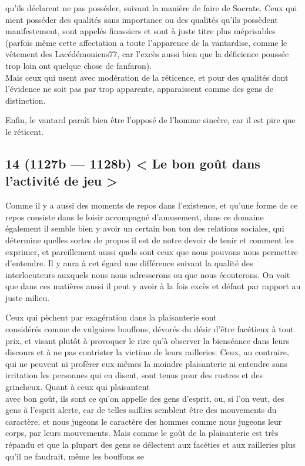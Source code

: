 \documentclass[french,twoside]{book} %
\begin{document}
qu’ils déclarent ne pas posséder, suivant la manière de faire de Socrate. Ceux qui nient posséder des qualités sans importance ou des qualités qu’ils possèdent manifestement, sont appelés finassiers et sont à juste titre plus méprisables (parfois même cette affectation a toute l’apparence de la vantardise, comme le vêtement des Lacédémoniens77, car l’excès aussi bien que la déficience poussée trop loin ont quelque chose de fanfaron). \\
Mais ceux qui usent avec modération de la réticence, et pour des qualités dont l’évidence ne soit pas par trop apparente, apparaissent comme des gens de distinction.\par
Enfin, le vantard paraît bien être l’opposé de l’homme sincère, car il est pire que le réticent.
\subsection[{14 (1127b — 1128b) < Le bon goût dans l’activité de jeu >}]{14 (1127b — 1128b) < Le bon goût dans l’activité de jeu >}
\noindent Comme il y a aussi des moments de repos dans l’existence, et qu’une forme de ce repos consiste dans le loisir accompagné d’amusement, dans ce domaine également il semble bien y avoir un certain bon ton des relations sociales,  qui détermine quelles sortes de propos il est de notre devoir de tenir et comment les exprimer, et pareillement aussi quels sont ceux que nous pouvons nous permettre d’entendre. Il y aura à cet égard une différence suivant la qualité des interlocuteurs auxquels nous nous adresserons ou que nous écouterons. On voit que dans ces matières aussi il peut y avoir à la fois excès et défaut par rapport au juste milieu.\par
Ceux qui pèchent par exagération dans la plaisanterie sont \\
considérés comme de vulgaires bouffons, dévorés du désir d’être facétieux à tout prix, et visant plutôt à provoquer le rire qu’à observer la bienséance dans leurs discours et à ne pas contrister la victime de leurs railleries. Ceux, au contraire, qui ne peuvent ni proférer eux-mêmes la moindre plaisanterie ni entendre sans irritation les personnes qui en disent, sont tenus pour des rustres et des grincheux. Quant à ceux qui plaisantent \\
avec bon goût, ils sont ce qu’on appelle des gens d’esprit, ou, si l’on veut, des gens à l’esprit alerte, car de telles saillies semblent être des mouvements du caractère, et nous jugeons le caractère des hommes comme nous jugeons leur corps, par leurs mouvements. Mais comme le goût de la plaisanterie est très répandu et que la plupart des gens se délectent aux facéties et aux railleries plus qu’il ne faudrait, même les bouffons se \\
\end{document}
